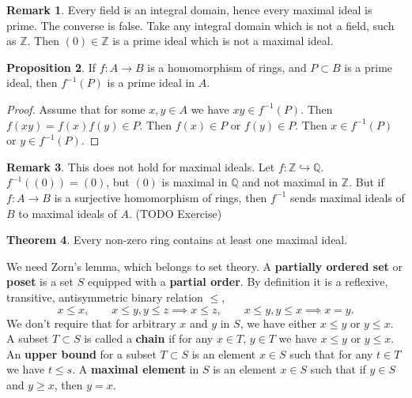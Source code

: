 \documentclass{article}
\newcommand{\Z}{\mathbb{Z}}
\newcommand{\Q}{\mathbb{Q}}
\newcommand{\rb}[1]{\left( #1 \right)}
\theoremstyle{definition}\newtheorem{definition}{Definition}[section]
\theoremstyle{definition}\newtheorem{remark}[definition]{Remark}
\theoremstyle{definition}\newtheorem*{example}{Example}
\theoremstyle{definition}\newtheorem*{note}{Note}
\newtheorem{proposition}[definition]{Proposition}
\newtheorem{theorem}[definition]{Theorem}
\begin{document}
\begin{remark}
Every field is an integral domain, hence every maximal ideal is prime. The converse is false. Take any integral domain which is not a field, such as $ \Z $. Then $ \rb{0} \in \Z $ is a prime ideal which is not a maximal ideal.
\end{remark}

\begin{proposition}
If $ f : A \to B $ is a homomorphism of rings, and $ P \subset B $ is a prime ideal, then $ f^{-1}\rb{P} $ is a prime ideal in $ A $.
\end{proposition}

\begin{proof}
Assume that for some $ x, y \in A $ we have $ xy \in f^{-1}\rb{P} $. Then $ f\rb{xy} = f\rb{x}f\rb{y} \in P $. Then $ f\rb{x} \in P $ or $ f\rb{y} \in P $. Then $ x \in f^{-1}\rb{P} $ or $ y \in f^{-1}\rb{P} $.
\end{proof}

\begin{remark}
This does not hold for maximal ideals. Let $ f : \Z \hookrightarrow \Q $. $ f^{-1}\rb{\rb{0}} = \rb{0} $, but $ \rb{0} $ is maximal in $ \Q $ and not maximal in $ \Z $. But if $ f : A \to B $ is a surjective homomorphism of rings, then $ f^{-1} $ sends maximal ideals of $ B $ to maximal ideals of $ A $. (TODO Exercise)
\end{remark}

\begin{theorem}
\label{thm:4.6}
Every non-zero ring contains at least one maximal ideal.
\end{theorem}

We need Zorn's lemma, which belongs to set theory. A \textbf{partially ordered set} or \textbf{poset} is a set $ S $ equipped with a \textbf{partial order}. By definition it is a reflexive, transitive, antisymmetric binary relation $ \le $,
$$ x \le x, \qquad x \le y, y \le z \implies x \le z, \qquad x \le y, y \le x \implies x = y. $$
We don't require that for arbitrary $ x $ and $ y $ in $ S $, we have either $ x \le y $ or $ y \le x $. A subset $ T \subset S $ is called a \textbf{chain} if for any $ x \in T $, $ y \in T $ we have $ x \le y $ or $ y \le x $. An \textbf{upper bound} for a subset $ T \subset S $ is an element $ x \in S $ such that for any $ t \in T $ we have $ t \le s $. A \textbf{maximal element} in $ S $ is an element $ x \in S $ such that if $ y \in S $ and $ y \ge x $, then $ y = x $.

\end{document}
